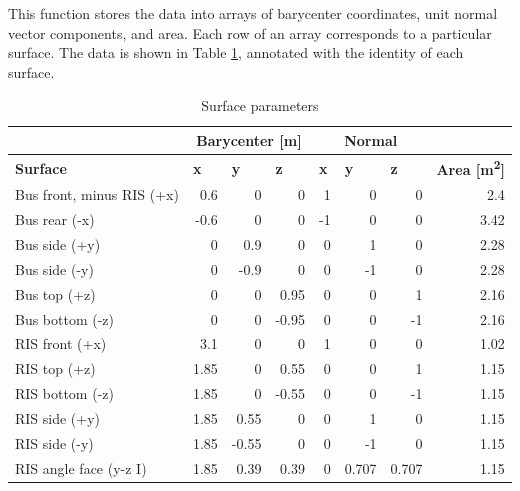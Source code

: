 

This function stores the data into arrays of barycenter coordinates, unit normal vector components, and area. Each row of an array corresponds to a particular surface. The data is shown in Table \ref{tab:surfaces}, annotated with the identity of each surface.

\begin{longtable}{l|r|r|r|r|r|r|r}
\caption{Surface parameters}
\label{tab:surfaces}\\
 &
  \multicolumn{3}{c}{\textbf{Barycenter [m]}} &
  \multicolumn{3}{c}{\textbf{Normal}} &
  \multicolumn{1}{l}{} \\
\endfirsthead
%
\endhead
%
\textbf{Surface} &
  \multicolumn{1}{l}{\textbf{x}} &
  \multicolumn{1}{l}{\textbf{y}} &
  \multicolumn{1}{l}{\textbf{z}} &
  \multicolumn{1}{l}{\textbf{x}} &
  \multicolumn{1}{l}{\textbf{y}} &
  \multicolumn{1}{l}{\textbf{z}} &
  \multicolumn{1}{l}{\textbf{Area [m\textsuperscript{2}]}} \\ \hline
Bus front, minus RIS (+x) & 0.6   & 0     & 0     & 1      & 0      & 0      & 2.4   \\
Bus rear (-x)                  & -0.6  & 0     & 0     & -1     & 0      & 0      & 3.42  \\
Bus side (+y)                  & 0     & 0.9   & 0     & 0      & 1      & 0      & 2.28  \\
Bus side (-y)                  & 0     & -0.9  & 0     & 0      & -1     & 0      & 2.28  \\
Bus top (+z)                   & 0     & 0     & 0.95  & 0      & 0      & 1      & 2.16  \\
Bus bottom (-z)                & 0     & 0     & -0.95 & 0      & 0      & -1     & 2.16  \\
RIS front (+x)                 & 3.1   & 0     & 0     & 1      & 0      & 0      & 1.02  \\
RIS top (+z)                   & 1.85  & 0     & 0.55  & 0      & 0      & 1      & 1.15  \\
RIS bottom (-z)                & 1.85  & 0     & -0.55 & 0      & 0      & -1     & 1.15  \\
RIS side (+y)                  & 1.85  & 0.55  & 0     & 0      & 1      & 0      & 1.15  \\
RIS side (-y)                  & 1.85  & -0.55 & 0     & 0      & -1     & 0      & 1.15  \\
RIS angle face (y-z I)         & 1.85  & 0.39  & 0.39  & 0      & 0.707  & 0.707  & 1.15  \\

\end{longtable}
